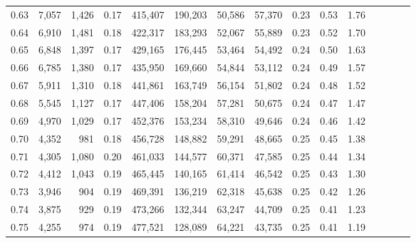 \begin{tabular}{rrrcrrrrrrrrrrr}
0.63 &   7,057 &   1,426 &                                       0.17 &  415,407 &  190,203 &   50,586 &   57,370 &  0.23 &  0.53 &                         1.76 \\
0.64 &   6,910 &   1,481 &                                       0.18 &  422,317 &  183,293 &   52,067 &   55,889 &  0.23 &  0.52 &                         1.70 \\
0.65 &   6,848 &   1,397 &                                       0.17 &  429,165 &  176,445 &   53,464 &   54,492 &  0.24 &  0.50 &                         1.63 \\
0.66 &   6,785 &   1,380 &                                       0.17 &  435,950 &  169,660 &   54,844 &   53,112 &  0.24 &  0.49 &                         1.57 \\
0.67 &   5,911 &   1,310 &                                       0.18 &  441,861 &  163,749 &   56,154 &   51,802 &  0.24 &  0.48 &                         1.52 \\
0.68 &   5,545 &   1,127 &                                       0.17 &  447,406 &  158,204 &   57,281 &   50,675 &  0.24 &  0.47 &                         1.47 \\
0.69 &   4,970 &   1,029 &                                       0.17 &  452,376 &  153,234 &   58,310 &   49,646 &  0.24 &  0.46 &                         1.42 \\
0.70 &   4,352 &     981 &                                       0.18 &  456,728 &  148,882 &   59,291 &   48,665 &  0.25 &  0.45 &                         1.38 \\
0.71 &   4,305 &   1,080 &                                       0.20 &  461,033 &  144,577 &   60,371 &   47,585 &  0.25 &  0.44 &                         1.34 \\
0.72 &   4,412 &   1,043 &                                       0.19 &  465,445 &  140,165 &   61,414 &   46,542 &  0.25 &  0.43 &                         1.30 \\
0.73 &   3,946 &     904 &                                       0.19 &  469,391 &  136,219 &   62,318 &   45,638 &  0.25 &  0.42 &                         1.26 \\
0.74 &   3,875 &     929 &                                       0.19 &  473,266 &  132,344 &   63,247 &   44,709 &  0.25 &  0.41 &                         1.23 \\
0.75 &   4,255 &     974 &                                       0.19 &  477,521 &  128,089 &   64,221 &   43,735 &  0.25 &  0.41 &                         1.19 \\

\end{tabular}
